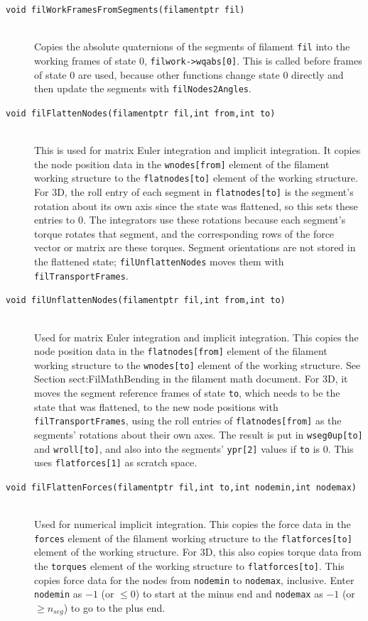 \documentclass {scrbook}
\newcommand {\ttt} {\texttt}
\begin{document}
\begin{description}
\item[\ttt{void filWorkFramesFromSegments(filamentptr fil)}]
\hfill \\
Copies the absolute quaternions of the segments of filament \ttt{fil} into the working frames of state 0, \ttt{filwork->wqabs[0]}. This is called before frames of state 0 are used, because other functions change state 0 directly and then update the segments with \ttt{filNodes2Angles}.

\item[\ttt{void filFlattenNodes(filamentptr fil,int from,int to)}]
\hfill \\
This is used for matrix Euler integration and implicit integration. It copies the node position data in the \ttt{wnodes[from]} element of the filament working structure to the \ttt{flatnodes[to]} element of the working structure. For 3D, the roll entry of each segment in \ttt{flatnodes[to]} is the segment's rotation about its own axis since the state was flattened, so this sets these entries to 0. The integrators use these rotations because each segment's torque rotates that segment, and the corresponding rows of the force vector or matrix are these torques. Segment orientations are not stored in the flattened state; \ttt{filUnflattenNodes} moves them with \ttt{filTransportFrames}.

\item[\ttt{void filUnflattenNodes(filamentptr fil,int from,int to)}]
\hfill \\
Used for matrix Euler integration and implicit integration. This copies the node position data in the \ttt{flatnodes[from]} element of the filament working structure to the \ttt{wnodes[to]} element of the working structure. See Section sect:FilMathBending in the filament math document. For 3D, it moves the segment reference frames of state \ttt{to}, which needs to be the state that was flattened, to the new node positions with \ttt{filTransportFrames}, using the roll entries of \ttt{flatnodes[from]} as the segments' rotations about their own axes. The result is put in \ttt{wseg0up[to]} and \ttt{wroll[to]}, and also into the segments' \ttt{ypr[2]} values if \ttt{to} is 0. This uses \ttt{flatforces[1]} as scratch space.

\item[\ttt{void filFlattenForces(filamentptr fil,int to,int nodemin,int nodemax)}]
\hfill \\
Used for numerical implicit integration. This copies the force data in the \ttt{forces} element of the filament working structure to the \ttt{flatforces[to]} element of the working structure. For 3D, this also copies torque data from the \ttt{torques} element of the working structure to \ttt{flatforces[to]}. This copies force data for the nodes from \ttt{nodemin} to \ttt{nodemax}, inclusive. Enter \ttt{nodemin} as $-1$ (or $\leq 0$) to start at the minus end and \ttt{nodemax} as $-1$ (or $\geq n_{seg}$) to go to the plus end.



\end{description}
\end{document}
